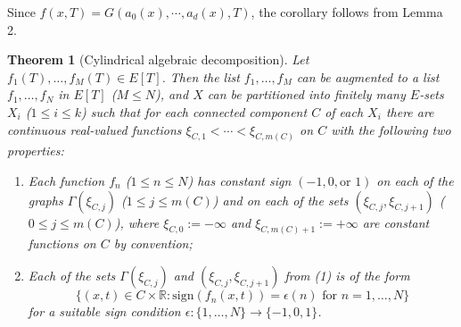 \documentclass[12pt]{article}
\theoremstyle{mythm}
\let\oldendproof\endproof
\renewenvironment{proof}[1][\proofname]{%
  \oldproof[\normalfont \bfseries \sffamily #1]%
}{\oldendproof}
\newtheorem{thm}{Theorem}[section]
\renewcommand*{\proofname}{Proof}
\renewcommand*{\proofname}{Proof}
\renewcommand*{\proofname}{Proof}
\renewcommand*{\proofname}{Proof}
\renewcommand*{\proofname}{Proof}
\renewcommand*{\proofname}{Proof}
\renewcommand*{\proofname}{Proof}
\begin{document}
\begin{proof}
Since \(f(x, T) = G(a_0(x), \cdots, a_d(x), T)\), the corollary follows from Lemma 2.
\end{proof}




\begin{thm}[Cylindrical algebraic decomposition]
    Let \( f_1(T), \ldots, f_M(T) \in E[T] \). Then the list \( f_1, \ldots, f_M \) can be augmented to a list \( f_1, \ldots, f_N \) in \( E[T] \) (\( M \leq N \)), and \( X \) can be partitioned into finitely many \( E \)-sets \( X_i \) (\( 1 \leq i \leq k \)) such that for each connected component \( C \) of each \( X_i \) there are continuous real-valued functions \( \xi_{C,1} < \cdots < \xi_{C,m(C)} \) on \( C \) with the following two properties:

\begin{enumerate}
    \item Each function \( f_n \) (\( 1 \leq n \leq N \)) has constant sign \( (-1, 0, \text{or } 1) \) on each of the graphs \( \Gamma(\xi_{C,j}) \) (\( 1 \leq j \leq m(C) \)) and on each of the sets \( (\xi_{C,j}, \xi_{C,j+1}) \) (\( 0 \leq j \leq m(C) \)), where \( \xi_{C,0} := -\infty \) and \( \xi_{C,m(C)+1} := +\infty \) are constant functions on \( C \) by convention;

    \item Each of the sets \( \Gamma(\xi_{C,j}) \) and \( (\xi_{C,j}, \xi_{C,j+1}) \) from (1) is of the form
    \[
    \{(x,t) \in C \times \mathbb{R}: \mathrm{sign}(f_n(x,t)) = \epsilon(n) \text{ for } n = 1, \ldots, N\}
    \]
    for a suitable sign condition \( \epsilon: \{1, \ldots, N\} \rightarrow \{-1,0,1\} \).
\end{enumerate}
\end{thm}
\end{document}
